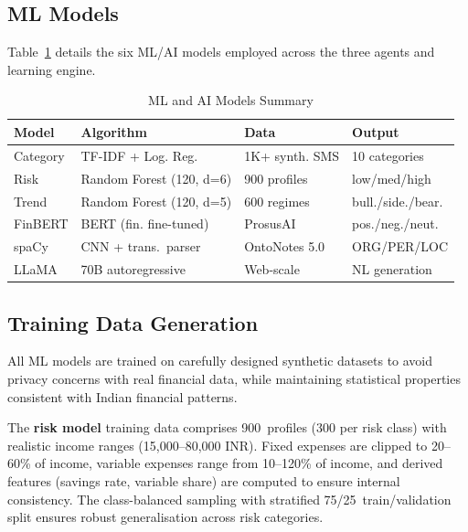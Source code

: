 \documentclass[conference]{IEEEtran}
\begin{document}
\subsection{ML Models}

Table~\ref{tab:models} details the six ML/AI models employed across the three agents and learning engine.

\begin{table}[!t]
\centering
\caption{ML and AI Models Summary}
\label{tab:models}
\renewcommand{\arraystretch}{1.15}
\footnotesize
\begin{tabular}{p{1.2cm} p{2.6cm} p{1.4cm} p{1.8cm}}
\toprule
\textbf{Model} & \textbf{Algorithm} & \textbf{Data} & \textbf{Output} \\
\midrule
Category  & TF-IDF + Log. Reg.            & 1K+ synth. SMS     & 10 categories \\
Risk      & Random Forest (120, d=6)      & 900 profiles       & low/med/high \\
Trend     & Random Forest (120, d=5)      & 600 regimes        & bull./side./bear. \\
FinBERT   & BERT (fin. fine-tuned)        & ProsusAI           & pos./neg./neut. \\
spaCy     & CNN + trans.\ parser           & OntoNotes 5.0      & ORG/PER/LOC \\
LLaMA     & 70B autoregressive            & Web-scale          & NL generation \\
\bottomrule
\end{tabular}
\end{table}

\subsection{Training Data Generation}

All ML models are trained on carefully designed synthetic datasets to avoid privacy concerns with real financial data, while maintaining statistical properties consistent with Indian financial patterns.

The \textbf{risk model} training data comprises 900~profiles (300 per risk class) with realistic income ranges (15,000--80,000 INR). Fixed expenses are clipped to 20--60\% of income, variable expenses range from 10--120\% of income, and derived features (savings rate, variable share) are computed to ensure internal consistency. The class-balanced sampling with stratified 75/25~train/validation split ensures robust generalisation across risk categories.
\end{document}

